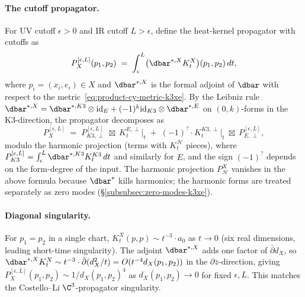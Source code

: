 \paragraph{The cutoff propagator.}
For UV cutoff $\epsilon > 0$ and IR cutoff $L > \epsilon$, define the
heat-kernel propagator with cutoffs as
\begin{equation}
\label{eq:cutoff-propagator-k3xe}
 P_X^{[\epsilon, L]}(p_1, p_2) \;=\; \int_\epsilon^L \bigl(\dbar^{*, X} K_t^X\bigr)(p_1, p_2) \, dt,
\end{equation}
where $p_i = (x_i, e_i) \in X$ and $\dbar^{*, X}$ is the formal adjoint
of $\dbar$ with respect to the metric~\eqref{eq:product-cy-metric-k3xe}.
By the Leibniz rule $\dbar^{*, X} = \dbar^{*, K3} \otimes \mathrm{id}_E + (-1)^k \mathrm{id}_{K3} \otimes \dbar^{*, E}$
on $(0, k)$-forms in the K3-direction, the propagator decomposes as
\begin{equation}
\label{eq:propagator-decomposition-k3xe}
 P_X^{[\epsilon, L]} \;=\; P_{K3, \perp}^{[\epsilon, L]} \;\boxtimes\; K_t^{E,\perp}\big|_t \;+\; (-1)^? \cdot K_t^{K3, \perp}\big|_t \;\boxtimes\; P_{E, \perp}^{[\epsilon, L]},
\end{equation}
modulo the harmonic projection (terms with $K_t^{\mathcal{H}}$ pieces),
where $P^{[\epsilon, L]}_{K3} = \int_\epsilon^L \dbar^{*, K3} K_t^{K3}\, dt$
and similarly for $E$, and the sign $(-1)^?$ depends on the form-degree of
the input. The harmonic projection $P_{\mathcal{H}}^X$ vanishes in the
above formula because $\dbar^{*}$ kills harmonics; the harmonic forms are
treated separately as zero modes \textup{(\S\ref{subsubsec:zero-modes-k3xe})}.

\paragraph{Diagonal singularity.}
For $p_1 = p_2$ in a single chart, $K_t^X(p, p) \sim t^{-3} \cdot a_0$
as $t \to 0$ (six real dimensions, leading short-time singularity). The
adjoint $\dbar^{*, X}$ adds one factor of $\bar{\partial} d_X$, so
$\dbar^{*, X} K_t^X \sim t^{-3} \cdot \bar{\partial}(d_X^2 / t) = O(t^{-4} d_X(p_1, p_2))$
in the $\partial \bar z$-direction, giving
$P_X^{[\epsilon, L]}(p_1, p_2) \sim 1 / d_X(p_1, p_2)^4$ as
$d_X(p_1, p_2) \to 0$ for fixed $\epsilon, L$. This matches the Costello--Li
$\C^3$-propagator singularity.

